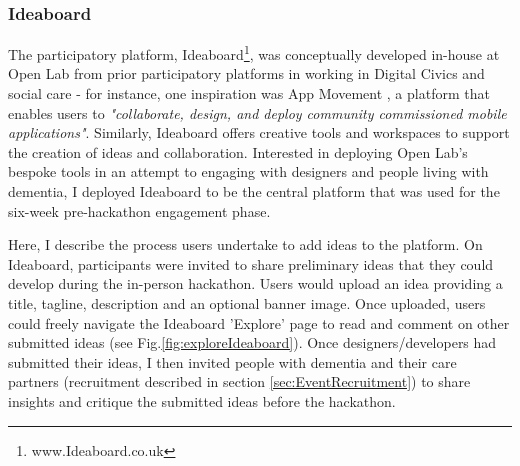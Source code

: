 \subsubsection{Ideaboard}
\label{sec:Ideaboard}
The participatory platform, Ideaboard\footnote{www.Ideaboard.co.uk}, was conceptually developed in-house at Open Lab from prior participatory platforms in working in Digital Civics and social care - for instance, one inspiration was App Movement \citep{garbett_app_2016}, a platform that enables users to \textit{"collaborate, design, and deploy community commissioned mobile applications"}. Similarly, Ideaboard offers creative tools and workspaces to support the creation of ideas and collaboration. Interested in deploying Open Lab's bespoke tools in an attempt to engaging with designers and people living with dementia, I deployed Ideaboard to be the central platform that was used for the six-week pre-hackathon engagement phase. 

Here, I describe the process users undertake to add ideas to the platform. On Ideaboard, participants were invited to share preliminary ideas that they could develop during the in-person hackathon. Users would upload an idea providing a title, tagline, description and an optional banner image. Once uploaded, users could freely navigate the Ideaboard 'Explore' page to read and comment on other submitted ideas (see Fig.\ref{fig:exploreIdeaboard}). Once designers/developers had submitted their ideas, I then invited people with dementia and their care partners (recruitment described in section \ref{sec:EventRecruitment}) to share insights and critique the submitted ideas before the hackathon. 

